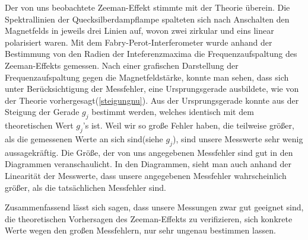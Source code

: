 \documentclass[10pt,a4paper]{article}
\begin{document}
Der von uns beobachtete Zeeman-Effekt stimmte mit der Theorie überein. Die Spektrallinien der Quecksilberdampflampe spalteten sich nach Anschalten den Magnetfelds in jeweils drei Linien auf, wovon zwei zirkular und eins linear polarisiert waren. Mit dem Fabry-Perot-Interferometer wurde anhand der Bestimmung von den Radien der Inteferenzmaxima die Frequenzaufspaltung des Zeeman-Effekts gemessen. Nach einer grafischen Darstellung der Frequenzaufspaltung gegen die Magnetfeldstärke, konnte man sehen, dass sich unter Berücksichtigung der Messfehler, eine Ursprungsgerade ausbildete, wie von der Theorie vorhergesagt(\ref{steigungnu}). Aus der Ursprungsgerade konnte aus der Steigung der Gerade $g_j$ bestimmt werden, welches identisch mit dem theoretischen Wert $g_j$'s ist. Weil wir so große Fehler haben, die teilweise größer, als die gemessenen Werte an sich sind(siehe $g_j$), sind unsere Messwerte sehr wenig aussagekräftig. Die Größe, der von uns angegebenen Messfehler sind gut in den Diagrammen veranschaulicht. In den Diagrammen, sieht man auch anhand der Linearität der Messwerte, dass unsere angegebenen Messfehler wahrscheinlich größer, als die tatsächlichen Messfehler sind.


Zusammenfassend lässt sich sagen, dass unsere Messungen zwar gut geeignet sind, die theoretischen Vorhersagen des Zeeman-Effekts zu verifizieren, sich konkrete Werte wegen den großen Messfehlern, nur sehr ungenau bestimmen lassen.
\end{document}
